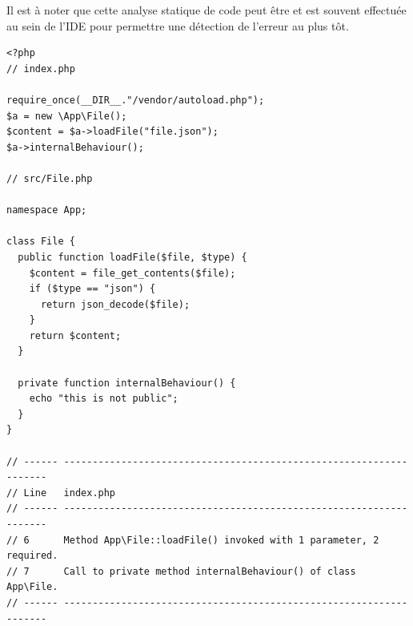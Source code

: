 Il est à noter que cette analyse statique de code peut être et est souvent effectuée au sein de l'\gls{IDE} pour permettre une détection de l'erreur au plus tôt.

\begin{verbatim}
<?php
// index.php

require_once(__DIR__."/vendor/autoload.php");
$a = new \App\File();
$content = $a->loadFile("file.json");
$a->internalBehaviour();

// src/File.php

namespace App;

class File {
  public function loadFile($file, $type) {
    $content = file_get_contents($file);
    if ($type == "json") {
      return json_decode($file);
    }
    return $content;
  }
  
  private function internalBehaviour() {
    echo "this is not public";
  }
}

// ------ ------------------------------------------------------------------- 
// Line   index.php                                                          
// ------ ------------------------------------------------------------------- 
// 6      Method App\File::loadFile() invoked with 1 parameter, 2 required.  
// 7      Call to private method internalBehaviour() of class App\File.      
// ------ ------------------------------------------------------------------- 

\end{verbatim}
\label{annexe:php-errorCode}
